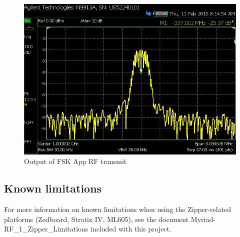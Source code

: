 \begin{figure}[ht]
\begin{minipage}{.45\textwidth}
			\centering\includegraphics[width=1.0\linewidth]{tx_spec_an}
			\caption{Output of FSK App RF transmit}
			\label{fig:tx_spec_an}
		\end{minipage}
	\end{figure}
\pagebreak
\subsection{Known limitations}
\noindent For more information on known limitations when using the Zipper-related platforms (Zedboard, Stratix IV, ML605), see the document Myriad-RF\_1\_Zipper\_Limitations included with this project.
